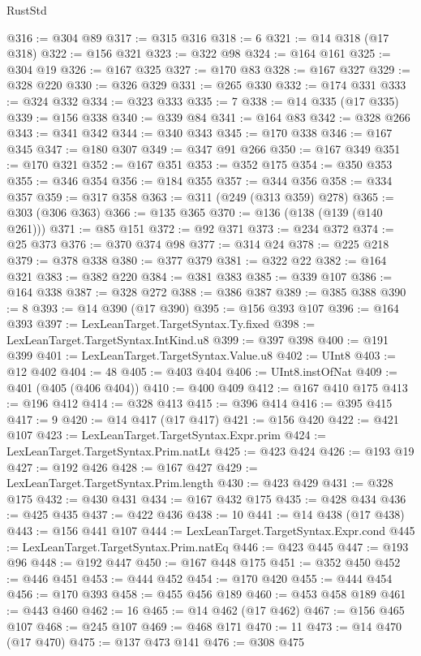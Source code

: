 \begin{lexlean}{RustStd}
\begin{coremodule}
@316 := @304 @89
@317 := @315 @316
@318 := 6
@321 := @14 @318 (@17 @318)
@322 := @156 @321
@323 := @322 @98
@324 := @164 @161
@325 := @304 @19
@326 := @167 @325
@327 := @170 @83
@328 := @167 @327
@329 := @328 @220
@330 := @326 @329
@331 := @265 @330
@332 := @174 @331
@333 := @324 @332
@334 := @323 @333
@335 := 7
@338 := @14 @335 (@17 @335)
@339 := @156 @338
@340 := @339 @84
@341 := @164 @83
@342 := @328 @266
@343 := @341 @342
@344 := @340 @343
@345 := @170 @338
@346 := @167 @345
@347 := @180 @307
@349 := @347 @91 @266
@350 := @167 @349
@351 := @170 @321
@352 := @167 @351
@353 := @352 @175
@354 := @350 @353
@355 := @346 @354
@356 := @184 @355
@357 := @344 @356
@358 := @334 @357
@359 := @317 @358
@363 := @311 (@249 (@313 @359) @278)
@365 := @303 (@306 @363)
@366 := @135 @365
@370 := @136 (@138 (@139 (@140 @261)))
@371 := @85 @151
@372 := @92 @371
@373 := @234 @372
@374 := @25 @373
@376 := @370 @374 @98
@377 := @314 @24
@378 := @225 @218
@379 := @378 @338
@380 := @377 @379
@381 := @322 @22
@382 := @164 @321
@383 := @382 @220
@384 := @381 @383
@385 := @339 @107
@386 := @164 @338
@387 := @328 @272
@388 := @386 @387
@389 := @385 @388
@390 := 8
@393 := @14 @390 (@17 @390)
@395 := @156 @393 @107
@396 := @164 @393
@397 := LexLeanTarget.TargetSyntax.Ty.fixed
@398 := LexLeanTarget.TargetSyntax.IntKind.u8
@399 := @397 @398
@400 := @191 @399
@401 := LexLeanTarget.TargetSyntax.Value.u8
@402 := UInt8
@403 := @12 @402
@404 := 48
@405 := @403 @404
@406 := UInt8.instOfNat
@409 := @401 (@405 (@406 @404))
@410 := @400 @409
@412 := @167 @410 @175
@413 := @196 @412
@414 := @328 @413
@415 := @396 @414
@416 := @395 @415
@417 := 9
@420 := @14 @417 (@17 @417)
@421 := @156 @420
@422 := @421 @107
@423 := LexLeanTarget.TargetSyntax.Expr.prim
@424 := LexLeanTarget.TargetSyntax.Prim.natLt
@425 := @423 @424
@426 := @193 @19
@427 := @192 @426
@428 := @167 @427
@429 := LexLeanTarget.TargetSyntax.Prim.length
@430 := @423 @429
@431 := @328 @175
@432 := @430 @431
@434 := @167 @432 @175
@435 := @428 @434
@436 := @425 @435
@437 := @422 @436
@438 := 10
@441 := @14 @438 (@17 @438)
@443 := @156 @441 @107
@444 := LexLeanTarget.TargetSyntax.Expr.cond
@445 := LexLeanTarget.TargetSyntax.Prim.natEq
@446 := @423 @445
@447 := @193 @96
@448 := @192 @447
@450 := @167 @448 @175
@451 := @352 @450
@452 := @446 @451
@453 := @444 @452
@454 := @170 @420
@455 := @444 @454
@456 := @170 @393
@458 := @455 @456 @189
@460 := @453 @458 @189
@461 := @443 @460
@462 := 16
@465 := @14 @462 (@17 @462)
@467 := @156 @465 @107
@468 := @245 @107
@469 := @468 @171
@470 := 11
@473 := @14 @470 (@17 @470)
@475 := @137 @473 @141
@476 := @308 @475

\end{coremodule}
\end{lexlean}
